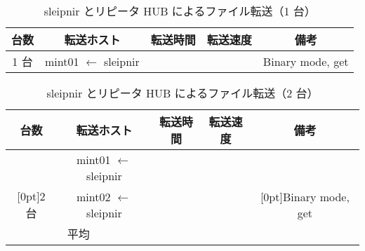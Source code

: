 \documentclass[a4j]{jreport}
\begin{document}
\begin{table}[H]
  \caption{sleipnir とリピータ HUB によるファイル転送（1 台）}
  \label{Table: sleipnir とリピータ HUB によるファイル転送（1 台）}
  \centering
  \begin{tabular}{|p{1cm}|p{2.5cm}|p{2.5cm}|p{3.5cm}|p{3cm}|}
	\hline
	\multicolumn{1}{|c|}{台数}		&
%	
		\multicolumn{1}{c|}{転送ホスト} &
		\multicolumn{1}{c|}{転送時間}	&
		\multicolumn{1}{c|}{転送速度}	&
		\multicolumn{1}{c|}{備考}	\\
	\hline
	\multicolumn{1}{|c|}{1 台}		&
		\multicolumn{1}{c|}{mint01 $\leftarrow$ sleipnir} &
			&			%
			&			%
		\multicolumn{1}{c|}{Binary mode, get}	\\	%
	\hline
  \end{tabular}
\end{table}

\begin{table}[H]
  \caption{sleipnir とリピータ HUB によるファイル転送（2 台）}
  \label{Table: sleipnir とリピータ HUB によるファイル転送（2 台）}
  \centering
  \begin{tabular}{|p{1.0cm}|p{2.5cm}|p{2.5cm}|p{3.5cm}|p{3.0cm}|}
	\hline
	\multicolumn{1}{|c|}{台数}		&
		\multicolumn{1}{c|}{転送ホスト} &
		\multicolumn{1}{c|}{転送時間}	&
		\multicolumn{1}{c|}{転送速度}	&
		\multicolumn{1}{c|}{備考}	\\
	\hline
		& \multicolumn{1}{c|}{mint01 $\leftarrow$ sleipnir} &
			&		%
			&		%
			\\		%
	\cline{2-4}
	\multicolumn{1}{|c|}{\raisebox{1.6ex}[0pt]{2 台}} &
%
		\multicolumn{1}{c|}{mint02 $\leftarrow$ sleipnir} &
			&		%
			&		%
		\multicolumn{1}{c|}{\raisebox{1.6ex}[0pt]{Binary mode, get}} \\
	\hline
	\multicolumn{2}{|c|}{平均}	&
			&		%
			&		%
			\\		%
	\hline
  \end{tabular}
\end{table}
\end{document}
